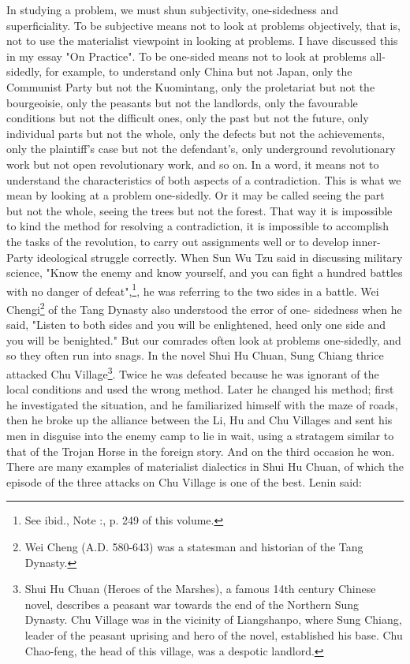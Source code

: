 \documentclass{article}
\begin{document}
In studying a problem, we must shun subjectivity, one-sidedness and
superficiality. To be subjective means not to look at problems objectively,
that is, not to use the materialist viewpoint in looking at problems. I have
discussed this in my essay "On Practice". To be one-sided means not to look at
problems all-sidedly, for example, to understand only China but not Japan, only
the Communist Party but not the Kuomintang, only the proletariat but not the
bourgeoisie, only the peasants but not the landlords, only the favourable
conditions but not the difficult ones, only the past but not the future, only
individual parts but not the whole, only the defects but not the achievements,
only the plaintiff's case but not the defendant's, only underground
revolutionary work but not open revolutionary work, and so on. In a word, it
means not to understand the characteristics of both aspects of a contradiction.
This is what we mean by looking at a problem one-sidedly. Or it may be called
seeing the part but not the whole, seeing the trees but not the forest. That
way it is impossible to kind the method for resolving a contradiction, it is
impossible to accomplish the tasks of the revolution, to carry out assignments
well or to develop inner-Party ideological struggle correctly. When Sun Wu Tzu
said in discussing military science, "Know the enemy and know yourself, and you
can fight a hundred battles with no danger of defeat",\footnote{See ibid., Note
:, p. 249 of this volume.}, he was referring to the two sides in a battle. Wei
Chengi\footnote{Wei Cheng (A.D. 580-643) was a statesman and historian of the
Tang Dynasty.} of the Tang Dynasty also understood the error of one- sidedness
when he said, "Listen to both sides and you will be enlightened, heed only one
side and you will be benighted." But our comrades often look at problems
one-sidedly, and so they often run into snags. In the novel Shui Hu Chuan, Sung
Chiang thrice attacked Chu Village\footnote{Shui Hu Chuan (Heroes of the
Marshes), a famous 14th century Chinese novel, describes a peasant war towards
the end of the Northern Sung Dynasty. Chu Village was in the vicinity of
Liangshanpo, where Sung Chiang, leader of the peasant uprising and hero of the
novel, established his base. Chu Chao-feng, the head of this village, was
a despotic landlord.}. Twice he was defeated because he was ignorant of the
local conditions and used the wrong method. Later he changed his method; first
he investigated the situation, and he familiarized himself with the maze of
roads, then he broke up the alliance between the Li, Hu and Chu Villages and
sent his men in disguise into the enemy camp to lie in wait, using a stratagem
similar to that of the Trojan Horse in the foreign story. And on the third
occasion he won. There are many examples of materialist dialectics in Shui Hu
Chuan, of which the episode of the three attacks on Chu Village is one of the
best. Lenin said:
\end{document}
